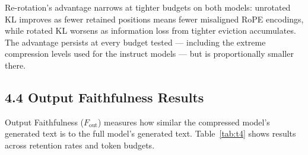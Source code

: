 \documentclass[10pt,letterpaper]{article}
\begin{document}
Re-rotation's advantage narrows at tighter budgets on both models: unrotated KL improves as fewer retained positions means fewer misaligned RoPE encodings, while rotated KL worsens as information loss from tighter eviction accumulates. The advantage persists at every budget tested --- including the extreme compression levels used for the instruct models --- but is proportionally smaller there.

\hypertarget{output-faithfulness-results}{%
\subsection{4.4 Output Faithfulness
Results}\label{output-faithfulness-results}}

Output Faithfulness (\(F_{\text{out}}\)) measures how similar the
compressed model's generated text is to the full model's generated text.
Table~\ref{tab:t4} shows results across retention rates and token budgets.
\end{document}
